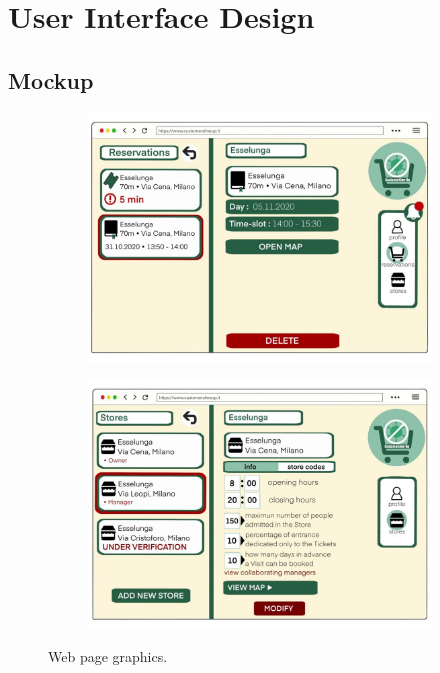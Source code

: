 \documentclass[a4paper, 12pt, oneside, table]{article}
\begin{document}
\newpage
\section{User Interface Design}

\subsection{Mockup}
\begin{figure}[h!]
\centering
\begin{subfigure}
    \centering
    \includegraphics[height=0.4\textheight, scale=0.2, keepaspectratio]{img/customer_interface.jpg} 
 \end{subfigure}
 \begin{subfigure}
    \centering
    \includegraphics[height=0.4\textheight, scale=0.2, keepaspectratio]{img/manager_interface.jpg}
 \end{subfigure}
    \caption{Web page graphics.}
    \label{web_graphics}
\end{figure}
\end{document}
